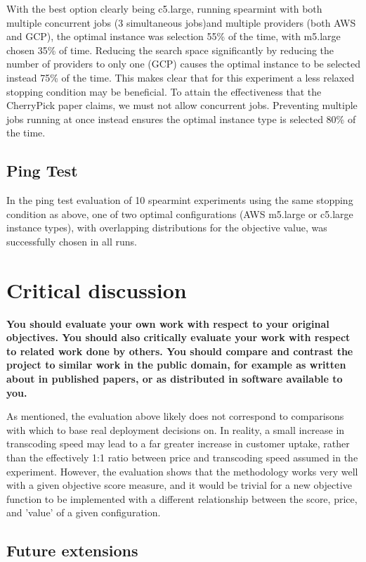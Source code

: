 \documentclass{article}
\begin{document}
With the best option clearly being c5.large, running spearmint with both multiple concurrent jobs (3 simultaneous jobs)and multiple providers (both AWS and GCP), the optimal instance was selection 55\% of the time, with m5.large chosen 35\% of time. Reducing the search space significantly by reducing the number of providers to only one (GCP) causes the optimal instance to be selected instead 75\% of the time. This makes clear that for this experiment a less relaxed stopping condition may be beneficial. To attain the effectiveness that the CherryPick paper claims, we must not allow concurrent jobs. Preventing multiple jobs running at once instead ensures the optimal instance type is selected 80\% of the time. 

\subsection{Ping Test}
In the ping test evaluation of 10 spearmint experiments using the same stopping condition as above, one of two optimal configurations (AWS m5.large or c5.large instance types), with overlapping distributions for the objective value, was successfully chosen in all runs.

\section{Critical discussion}
\textbf{You should evaluate your own work with respect to your
original objectives. You should also critically evaluate
your work with respect to related work done by others.
You should compare and contrast the project to similar
work in the public domain, for example as written about
in published papers, or as distributed in software available to you. }

As mentioned, the evaluation above likely does not correspond to comparisons with which to base real deployment decisions on. In reality, a small increase in transcoding speed may lead to a far greater increase in customer uptake, rather than the effectively 1:1 ratio between price and transcoding speed assumed in the experiment. However, the evaluation shows that the methodology works very well with a given objective score measure, and it would be trivial for a new objective function to be implemented with a different relationship between the score, price, and 'value' of a given configuration.
\subsection{Future extensions}
\end{document}
